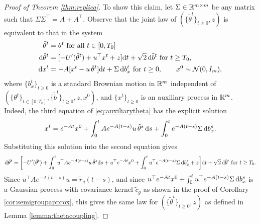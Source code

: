 \begin{proof}[Proof of Theorem \ref{thm:replica}]
To show this claim, let $\Sigma \in \mathbb{R}^{m \times m}$ be any matrix such that
$\Sigma\Sigma^\top=A+A^\top$. Observe that the
joint law of $(\{\tilde\theta^t\}_{t \geq 0},z)$
is equivalent to that in the system
\begin{equation}\label{eq:auxiliarytheta}
\begin{aligned}
\tilde \theta^t&=\theta^t \text{ for all } t \in [0,T_0]\\
\mathrm{d} \tilde \theta^t&=[{-}U'(\tilde \theta^t)
+u^\top x^t+z]\mathrm{d} t+\sqrt{2}\,\mathrm{d}\tilde b^t \text{ for } t \geq T_0,\\
\mathrm{d} x^t&={-}A[x^t-u\,\tilde \theta^t]\mathrm{d} t+\Sigma\,\mathrm{d} b_x^t \text{ for } t \geq 0,
\qquad x^0 \sim \mathcal{N}(0, I_m),
\end{aligned}
\end{equation}
where $\{b_x^t\}_{t \geq 0}$ is a standard Brownian motion in $\mathbb{R}^m$ independent
of $(\{\theta^t\}_{t \in [0,T_0]},\{\tilde b^t\}_{t \geq 0},z,x^0)$,
and $\{x^t\}_{t \geq 0}$ is an auxiliary process in $\mathbb{R}^m$. Indeed, the third
equation of \eqref{eq:auxiliarytheta} has the explicit solution
\begin{equation}\label{eq:xtsolution}
x^t=e^{-At} x^0 + \int_0^t Ae^{-A(t-s)}u\,\tilde\theta^s\,\mathrm{d} s
+\int_0^t e^{-A(t-s)}\Sigma\,\mathrm{d} b_x^s.
\end{equation}
Substituting this solution into the second equation gives
\[\mathrm{d}\tilde\theta^t=\bigg[{-}U'(\tilde\theta^t)+\int_0^t u^\top
Ae^{-A(t-s)}u\,\tilde \theta^s \mathrm{d} s+u^\top e^{-At} x^0+\int_0^t u^\top e^{-A(t-s)}\Sigma\,\mathrm{d} b_x^s
+z\bigg]\mathrm{d} t+\sqrt{2}\,\mathrm{d}\tilde b^t \text{ for } t \geq T_0.\]
Since $u^\top Ae^{-A(t-s)}u=\tilde r_g(t-s)$, and since $u^\top e^{-At} x^0+\int_0^t u^\top
e^{-A(t-s)}\Sigma\,\mathrm{d} b_x^s$ is a Gaussian process with covariance kernel
$\tilde c_g$ as shown in the proof of Corollary \ref{cor:semigroupapprox},
this gives the same law for $(\{\tilde\theta^t\}_{t \geq 0},z)$
as defined in Lemma \ref{lemma:thetacoupling}.


\end{proof}
